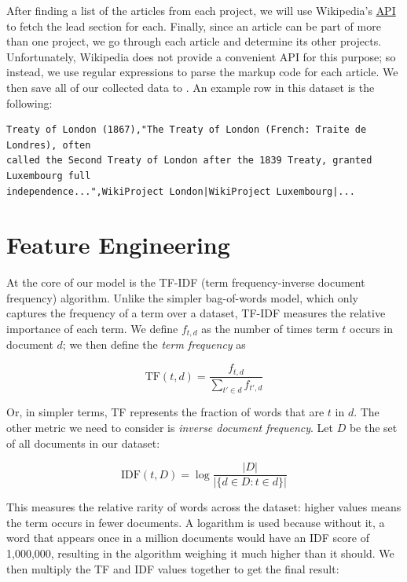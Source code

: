 \documentclass{article}
\newcommand*{\code}[1]{\texttt{\detokenize{#1}}}
\begin{document}
After finding a list of the articles from each project, we will use Wikipedia's
\href{https://www.mediawiki.org/wiki/Extension:TextExtracts}{\code{extracts} API} to fetch
the lead section for each. Finally, since an article can be part of more than one project,
we go through each article and determine its other projects. Unfortunately, Wikipedia does
not provide a convenient API for this purpose; so instead, we use regular expressions to
parse the markup code for each article. We then save all of our collected data to
\code{all_data.csv}. An example row in this dataset is the following:

\begin{lstlisting}
Treaty of London (1867),"The Treaty of London (French: Traite de Londres), often
called the Second Treaty of London after the 1839 Treaty, granted Luxembourg full
independence...",WikiProject London|WikiProject Luxembourg|...
\end{lstlisting}

\section{Feature Engineering}

At the core of our model is the TF-IDF (term frequency-inverse document frequency) algorithm.
Unlike the simpler bag-of-words model, which only captures the frequency of a term over a
dataset, TF-IDF measures the relative importance of each term. We define $f_{t,d}$ as the number
of times term $t$ occurs in document $d$; we then define the \textit{term frequency} as

\begin{equation*}
	\text{TF}(t, d) = \frac{f_{t,d}}{\sum_{t'\in d}f_{t',d}}
\end{equation*}

Or, in simpler terms, TF represents the fraction of words that are $t$ in $d$. The other metric
we need to consider is \textit{inverse document frequency}. Let $D$ be the set of all documents
in our dataset:

\begin{equation*}
	\text{IDF}(t, D) = \log{\frac{|D|}{|\{d\in D : t\in d\}|}}
\end{equation*}

This measures the relative rarity of words across the dataset: higher values means the term
occurs in fewer documents. A logarithm is used because without it, a word that appears once
in a million documents would have an IDF score of 1,000,000, resulting in the algorithm weighing
it much higher than it should. We then multiply the TF and IDF values together to get the
final result:
\end{document}
